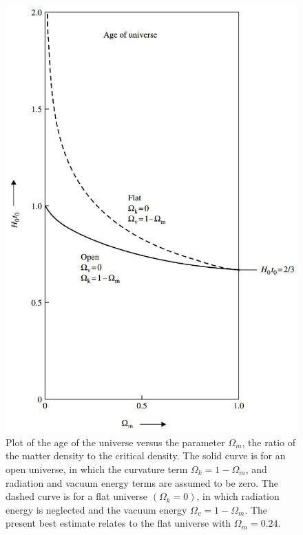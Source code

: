 \documentclass[12pt,a4paper]{article}
\begin{document}
\begin{figure}
\centering
\includegraphics[height=16.cm,angle=0]{age_universe.eps}
\caption{Plot of the age of the universe versus the parameter $\Omega_m$, the ratio of the matter density to the critical density. The solid curve is for an open universe, in which the curvature term $\Omega_k = 1- \Omega_m$, and radiation and vacuum energy terms are assumed to be zero. The dashed curve is for a flat universe $(\Omega_k = 0)$, in which radiation energy is neglected and the vacuum energy $\Omega_v = 1 - \Omega_m$. The present best estimate relates to the flat universe with $\Omega_m = 0.24$.} 
\label{fig:age_universe}
\end{figure}
\end{document}
